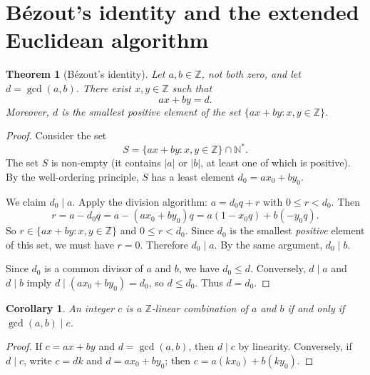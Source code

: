 \documentclass[12pt,a4paper,openany]{book}
\theoremstyle{definition}
\theoremstyle{plain}
\newtheorem{theorem}[definition]{Theorem}
\newtheorem{corollary}[definition]{Corollary}
\theoremstyle{remark}
\newcommand{\N}{\mathbb{N}}
\newcommand{\Z}{\mathbb{Z}}
\newcommand{\abs}[1]{\left|#1\right|}
\begin{document}
\section{B\'{e}zout's identity and the extended Euclidean algorithm}
\label{sec:bezout}

\begin{theorem}[B\'{e}zout's identity]
\label{thm:bezout}
Let $a,b \in \Z$, not both zero, and let $d = \gcd(a,b)$. There exist
$x, y \in \Z$ such that
\[
  ax + by = d.
\]
Moreover, $d$ is the smallest positive element of the set
$\{ax + by : x,y \in \Z\}$.
\end{theorem}

\begin{proof}
Consider the set
\[
  S = \{ax + by : x,y \in \Z\} \cap \N^{*}.
\]
The set $S$ is non-empty (it contains $\abs{a}$ or $\abs{b}$, at least one of
which is positive). By the well-ordering principle, $S$ has a least element
$d_0 = ax_0 + by_0$.

We claim $d_0 \mid a$. Apply the division algorithm: $a = d_0 q + r$ with
$0 \le r < d_0$. Then
\[
  r = a - d_0 q = a - (ax_0 + by_0)q = a(1 - x_0 q) + b(-y_0 q).
\]
So $r \in \{ax + by : x,y \in \Z\}$ and $0 \le r < d_0$. Since $d_0$ is the
smallest \emph{positive} element of this set, we must have $r = 0$. Therefore
$d_0 \mid a$. By the same argument, $d_0 \mid b$.

Since $d_0$ is a common divisor of $a$ and $b$, we have $d_0 \le d$.
Conversely, $d \mid a$ and $d \mid b$ imply $d \mid (ax_0 + by_0) = d_0$,
so $d \le d_0$. Thus $d = d_0$.
\end{proof}

\begin{corollary}
\label{cor:gcd-linear-comb}
An integer $c$ is a $\Z$-linear combination of $a$ and $b$ if and only if
$\gcd(a,b) \mid c$.
\end{corollary}

\begin{proof}
If $c = ax + by$ and $d = \gcd(a,b)$, then $d \mid c$ by linearity.
Conversely, if $d \mid c$, write $c = dk$ and $d = ax_0 + by_0$; then
$c = a(kx_0) + b(ky_0)$.
\end{proof}
\end{document}
